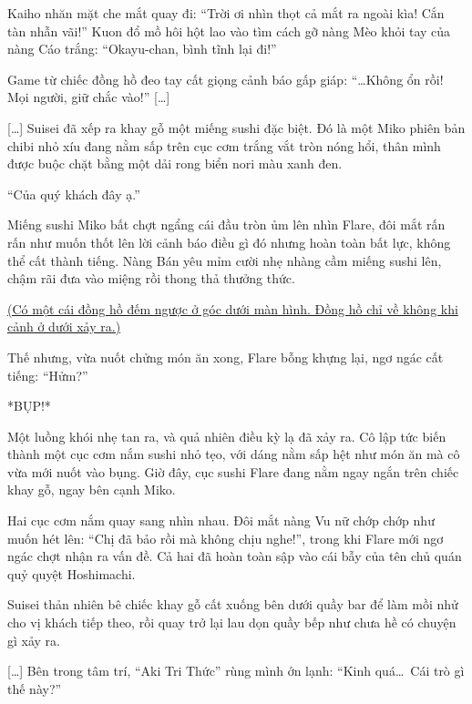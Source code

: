 \documentclass[../main.tex]{subfiles}
\begin{document}
Kaiho nhăn mặt che mắt quay đi: ``Trời ơi nhìn thọt cả mắt ra ngoài kìa! Cắn tàn nhẫn vãi!'' Kuon đổ mồ hôi hột lao vào tìm cách gỡ nàng Mèo khỏi tay của nàng Cáo trắng: ``Okayu-chan, bình tĩnh lại đi!''

Game từ chiếc đồng hồ đeo tay cất giọng cảnh báo gấp giáp: ``\dots Không ổn rồi! Mọi người, giữ chắc vào!'' [\dots]


[\dots] Suisei đã xếp ra khay gỗ một miếng sushi đặc biệt. Đó là một Miko phiên bản chibi nhỏ xíu đang nằm sấp trên cục cơm trắng vắt tròn nóng hổi, thân mình được buộc chặt bằng một dải rong biển nori màu xanh đen.

``Của quý khách đây ạ.''

Miếng sushi Miko bất chợt ngẩng cái đầu tròn ủm lên nhìn Flare, đôi mắt rấn rấn như muốn thốt lên lời cảnh báo điều gì đó nhưng hoàn toàn bất lực, không thể cất thành tiếng. Nàng Bán yêu mỉm cười nhẹ nhàng cầm miếng sushi lên, chậm rãi đưa vào miệng rồi thong thả thưởng thức.


\begin{center}
  \uline{(Có một cái đồng hồ đếm ngược ở góc dưới màn hình. Đồng hồ chỉ về không khi cảnh ở dưới xảy ra.)}
\end{center}

Thế nhưng, vừa nuốt chửng món ăn xong, Flare bỗng khựng lại, ngơ ngác cất tiếng: ``Hửm?''

*BỤP!*

Một luồng khói nhẹ tan ra, và quả nhiên điều kỳ lạ đã xảy ra. Cô lập tức biến thành một cục cơm nắm sushi nhỏ tẹo, với dáng nằm sấp hệt như món ăn mà cô vừa mới nuốt vào bụng. Giờ đây, cục sushi Flare đang nằm ngay ngắn trên chiếc khay gỗ, ngay bên cạnh Miko.


Hai cục cơm nắm quay sang nhìn nhau. Đôi mắt nàng Vu nữ chớp chớp như muốn hét lên: ``Chị đã bảo rồi mà không chịu nghe!'', trong khi Flare mới ngơ ngác chợt nhận ra vấn đề. Cả hai đã hoàn toàn sập vào cái bẫy của tên chủ quán quỷ quyệt Hoshimachi.

Suisei thản nhiên bê chiếc khay gỗ cất xuống bên dưới quầy bar để làm mồi nhử cho vị khách tiếp theo, rồi quay trở lại lau dọn quầy bếp như chưa hề có chuyện gì xảy ra.


[\dots] Bên trong tâm trí, ``Aki Tri Thức'' rùng mình ớn lạnh: ``Kinh quá\dots\ Cái trò gì thế này?''
\end{document}
